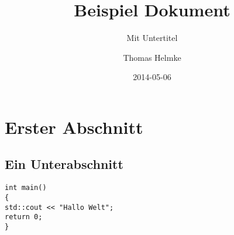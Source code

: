 \documentclass[titlepage]{scrartcl}
\title{Beispiel Dokument}
\subtitle{Mit Untertitel}
\author{Thomas Helmke}
\date{2014-05-06}
\begin{document}
\maketitle

\tableofcontents
\clearpage

\section{Erster Abschnitt}\label{sec:Kapitel1}
\subsection{Ein Unterabschnitt}
\begin{lstlisting}
int main()
{
std::cout << "Hallo Welt";
return 0;
}
\end{lstlisting}
\end{document}

